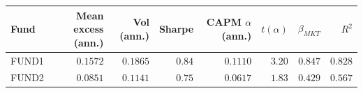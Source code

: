 \begin{tabular}{lrrrrrrr}
\toprule
Fund & Mean excess (ann.) & Vol (ann.) & Sharpe & CAPM $\alpha$ (ann.) & $t(\alpha)$ & $\beta_{MKT}$ & $R^2$ \\
\midrule
FUND1 & $0.1572$ & $0.1865$ & $0.84$ & $0.1110$ & $3.20$ & $0.847$ & $0.828$ \\
FUND2 & $0.0851$ & $0.1141$ & $0.75$ & $0.0617$ & $1.83$ & $0.429$ & $0.567$ \\
\bottomrule
\end{tabular}
